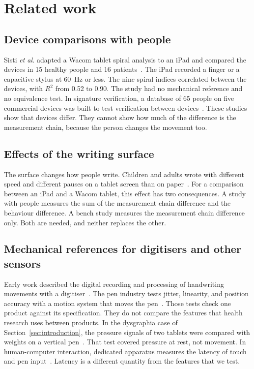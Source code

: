 \section{Related work}
\label{sec:related}

\subsection{Device comparisons with people}
Sisti \emph{et al.} adapted a Wacom tablet spiral analysis to an iPad and compared the devices in 15 healthy people and 16 patients~\cite{Sisti2017}.
The iPad recorded a finger or a capacitive stylus at 60~Hz or less.
The nine spiral indices correlated between the devices, with $R^2$ from 0.52 to 0.90.
The study had no mechanical reference and no equivalence test.
In signature verification, a database of 65 people on five commercial devices was built to test verification between devices~\cite{Tolosana2017}.
These studies show that devices differ.
They cannot show how much of the difference is the measurement chain, because the person changes the movement too.

\subsection{Effects of the writing surface}
The surface changes how people write.
Children and adults wrote with different speed and different pauses on a tablet screen than on paper~\cite{Alamargot2015,Gerth2016a,Gerth2016b}.
For a comparison between an iPad and a Wacom tablet, this effect has two consequences.
A study with people measures the sum of the measurement chain difference and the behaviour difference.
A bench study measures the measurement chain difference only.
Both are needed, and neither replaces the other.

\subsection{Mechanical references for digitisers and other sensors}
Early work described the digital recording and processing of handwriting movements with a digitiser~\cite{Teulings1984}.
The pen industry tests jitter, linearity, and position accuracy with a motion system that moves the pen~\cite{Haran2014}.
Those tests check one product against its specification.
They do not compare the features that health research uses between products.
In the dysgraphia case of Section~\ref{sec:introduction}, the pressure signals of two tablets were compared with weights on a vertical pen~\cite{Asselborn2019}.
That test covered pressure at rest, not movement.
In human-computer interaction, dedicated apparatus measures the latency of touch and pen input~\cite{Ng2012,Casiez2017}.
Latency is a different quantity from the features that we test.

